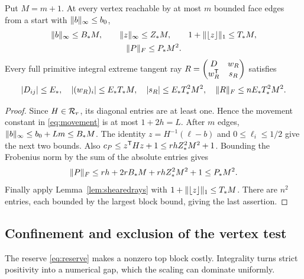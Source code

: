 \begin{lemma}\label{lem:heights}
Put $M=m+1$. At every vertex reachable by at most $m$ bounded face edges from a start with $\lVert b\rVert_\infty\le b_0$,
\begin{gather}\label{eq:vertexbounds}
 \lVert b\rVert_\infty\le B_*M,\qquad
 \lVert z\rVert_\infty\le Z_*M,\qquad
 1+\lVert \lfloor z\rfloor\rVert_1\le T_*M,\\
 \lVert P\rVert_F\le P_*M^2.
\end{gather}
Every full primitive integral extreme tangent ray $R=\begin{pmatrix}D&w_R\\w_R^{\mathsf T}&s_R\end{pmatrix}$ satisfies
\begin{equation}\label{eq:fullraybounds}
 |D_{ij}|\le E_*,\quad |(w_R)_i|\le E_*T_*M,\quad
 |s_R|\le E_*T_*^2M^2,\quad \lVert R\rVert_F\le nE_*T_*^2M^2.
\end{equation}
\end{lemma}
\begin{proof}
Since $H\in\mathcal R_r$, its diagonal entries are at least one. Hence the movement constant in \eqref{eq:movement} is at most $1+2h=L$. After $m$ edges,
$\lVert b\rVert_\infty\le b_0+Lm\le B_*M$. The identity $z=H^{-1}(\ell-b)$ and $0\le\ell_i\le1/2$ give the next two bounds. Also
$c_P\le z^{\mathsf T} Hz+1\le rhZ_*^2M^2+1$.
Bounding the Frobenius norm by the sum of the absolute entries gives
\[
 \lVert P\rVert_F\le rh+2rB_*M+rhZ_*^2M^2+1\le P_*M^2.
\]
Finally apply Lemma~\ref{lem:shearedrays} with $1+\lVert \lfloor z\rfloor\rVert_1\le T_*M$. There are $n^2$ entries, each bounded by the largest block bound, giving the last assertion.
\end{proof}

\subsection{Confinement and exclusion of the vertex test}
The reserve \eqref{eq:reserve} makes a nonzero top block costly. Integrality turns strict positivity into a numerical gap, which the scaling can dominate uniformly.

